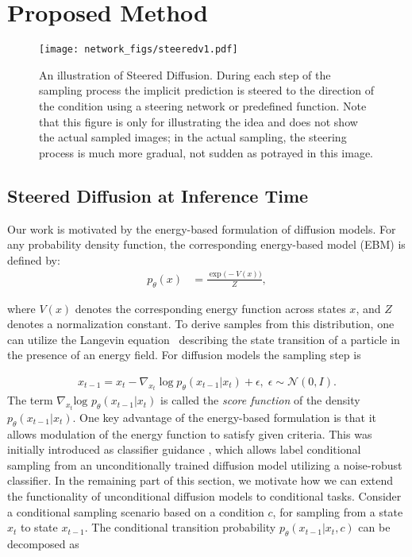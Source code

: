 \documentclass[10pt,twocolumn,letterpaper]{article}
\begin{document}
\section{Proposed Method}
\begin{figure*}[tb]
    \centering
    \texttt{[image: network\_figs/steeredv1.pdf]}
    \vspace{-9mm}
  \caption{{An illustration of Steered Diffusion. During each step of the sampling process the implicit prediction is steered to the direction of the condition using a steering network or predefined function. Note that this figure is only for illustrating the idea and does not show the actual sampled images; in the actual sampling, the steering process is much more gradual, not sudden as potrayed in this image.}}
    \label{fig:steered}
    \vspace{-5mm}
\end{figure*}
\subsection{Steered Diffusion at Inference Time}
\label{sec:theory}
Our work is motivated by the energy-based formulation of diffusion models. 
For any probability density function, the corresponding energy-based model (EBM) is defined by:
\begin{align}
    p_{\theta}(x) &=\frac{\exp\big( -V(x)\big)}{Z}, 
    \label{eq:ebm}
\end{align}

\noindent where $V(x)$ denotes the corresponding energy function across states $x$, and $Z$ denotes a normalization constant. To derive samples from this distribution, one can utilize the Langevin equation~\cite{sekimoto1998langevin} describing the state transition of a particle in the presence of an energy field. For diffusion models the sampling step is

\begin{align}
x_{t-1} \!= x_t - \nabla_{x_t}\log p_{\theta}(x_{t-1}|x_t) + \epsilon, \; \epsilon \!\sim\! \mathcal{N}(0,I).
\label{eq:reverse_langevin}
\end{align}
The term $\nabla_{x_t} \text{log }p_{\theta}(x_{t-1}|x_t)$ is called the \emph{score function} of the density $p_{\theta}(x_{t-1}|x_t)$.  One key advantage of the energy-based formulation is that it allows modulation of the energy function to satisfy given criteria. This was initially introduced as classifier guidance \cite{dhariwal2021diffusion}, which allows label conditional sampling from an unconditionally trained diffusion model utilizing a noise-robust classifier. In the remaining part of this section, we motivate how we can extend the functionality of unconditional diffusion models to conditional tasks. 
Consider a conditional sampling scenario based on a condition $c$, for sampling from a state $x_t$ to state $x_{t-1}$. The conditional transition probability $p_{\theta}(x_{t-1}|x_{t},c)$ can be decomposed as 
\end{document}
